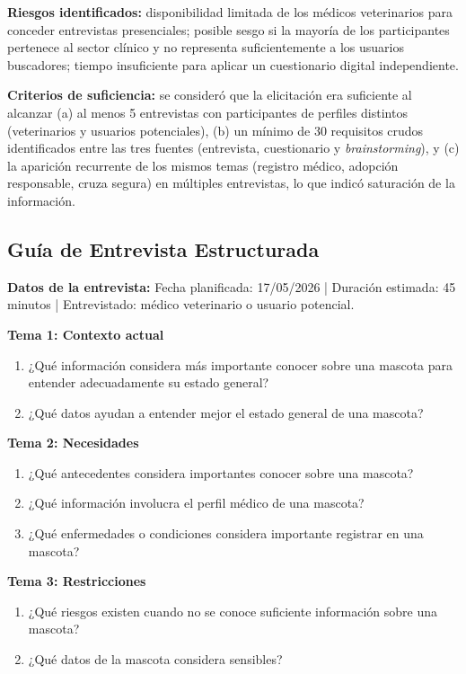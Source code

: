 \documentclass[journal,onecolumn]{IEEEtran}
\begin{document}
\textbf{Riesgos identificados:} disponibilidad limitada de los médicos
veterinarios para conceder entrevistas presenciales; posible sesgo si la
mayoría de los participantes pertenece al sector clínico y no representa
suficientemente a los usuarios buscadores; tiempo insuficiente para aplicar
un cuestionario digital independiente.

\textbf{Criterios de suficiencia:} se consideró que la elicitación era
suficiente al alcanzar (a) al menos 5 entrevistas con participantes de
perfiles distintos (veterinarios y usuarios potenciales), (b) un mínimo de
30 requisitos crudos identificados entre las tres fuentes (entrevista,
cuestionario y \textit{brainstorming}), y (c) la aparición recurrente de los
mismos temas (registro médico, adopción responsable, cruza segura) en
múltiples entrevistas, lo que indicó saturación de la información.

\subsection{Guía de Entrevista Estructurada}

\textbf{Datos de la entrevista:} Fecha planificada: 17/05/2026 | 
Duración estimada: 45 minutos | Entrevistado: médico veterinario o usuario potencial.

\vspace{0.5em}

\noindent\textbf{Tema 1: Contexto actual}
\begin{enumerate}[label=\textbf{P\arabic*.}, leftmargin=*]
	\item ¿Qué información considera más importante conocer sobre una mascota para entender adecuadamente su estado general?
	\item ¿Qué datos ayudan a entender mejor el estado general de una mascota?
\end{enumerate}

\noindent\textbf{Tema 2: Necesidades}
\begin{enumerate}[label=\textbf{P\arabic*.}, leftmargin=*, resume]
	\item ¿Qué antecedentes considera importantes conocer sobre una mascota?
	\item ¿Qué información involucra el perfil médico de una mascota?
	\item ¿Qué enfermedades o condiciones considera importante registrar en una mascota?
\end{enumerate}

\noindent\textbf{Tema 3: Restricciones}
\begin{enumerate}[label=\textbf{P\arabic*.}, leftmargin=*, resume]
	\item ¿Qué riesgos existen cuando no se conoce suficiente información sobre una mascota?
	\item ¿Qué datos de la mascota considera sensibles?
\end{enumerate}
\end{document}
